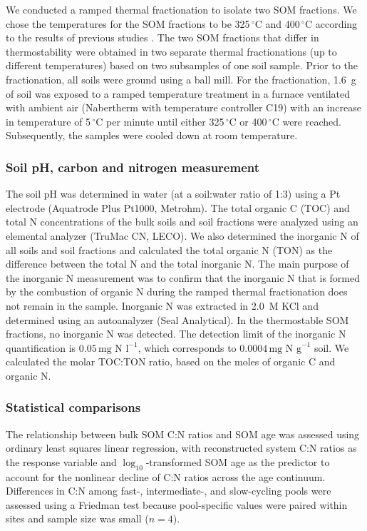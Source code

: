\documentclass[bg, manuscript]{copernicus}
\begin{document}
We conducted a ramped thermal fractionation to isolate two SOM fractions. We chose the temperatures for the SOM fractions to be 325\,$^\circ\text{C}$ and 400\,$^\circ\text{C}$ according to the results of previous studies \citep{Sanderman2020, Stoner2023}. The two SOM fractions that differ in thermostability were obtained in two separate thermal fractionations (up to different temperatures) based on two subsamples of one soil sample. Prior to the fractionation, all soils were ground using a ball mill. For the fractionation, 1.6~g of soil was exposed to a ramped temperature treatment in a furnace ventilated with ambient air (Nabertherm with temperature controller C19) with an increase in temperature of 5\,$^\circ\text{C}$ per minute until either 325\,$^\circ\text{C}$ or 400\,$^\circ\text{C}$ were reached. Subsequently, the samples were cooled down at room temperature.

\subsubsection{Soil pH, carbon and nitrogen measurement}
The soil pH was determined in water (at a soil:water ratio of 1:3) using a Pt electrode (Aquatrode Plus Pt1000, Metrohm). The total organic C (TOC) and total N concentrations of the bulk soils and soil fractions were analyzed using an elemental analyzer (TruMac CN, LECO). We also determined the inorganic N of all soils and soil fractions and calculated the total organic N (TON) as the difference between the total N and the total inorganic N. The main purpose of the inorganic N measurement was to confirm that the inorganic N that is formed by the combustion of organic N during the ramped thermal fractionation does not remain in the sample. Inorganic N was extracted in 2.0~M KCl and determined using an autoanalyzer (Seal Analytical). In the thermostable SOM fractions, no inorganic N was detected. The detection limit of the inorganic N quantification is $0.05\,\text{mg N l}^{-1}$, which corresponds to $0.0004\,\text{mg N g}^{-1}$ soil. We calculated the molar TOC:TON ratio, based on the moles of organic C and organic N.

\subsubsection{Statistical comparisons}
The relationship between bulk SOM C:N ratios and SOM age was assessed using ordinary least squares linear regression, with reconstructed system C:N ratios as the response variable and $\log_{10}$-transformed SOM age as the predictor to account for the nonlinear decline of C:N ratios across the age continuum. Differences in C:N among fast-, intermediate-, and slow-cycling pools were assessed using a Friedman test because pool-specific values were paired within sites and sample size was small ($n = 4$).
\end{document}

